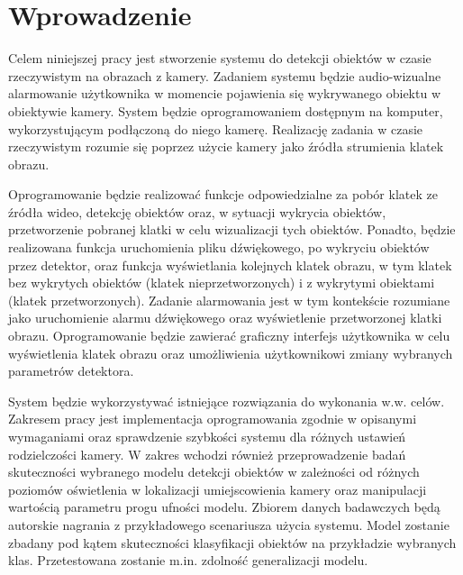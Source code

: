 \chapter{Wprowadzenie}
Celem niniejszej pracy jest stworzenie systemu do detekcji obiektów w czasie rzeczywistym na obrazach z kamery. Zadaniem systemu będzie audio-wizualne alarmowanie użytkownika w momencie pojawienia się wykrywanego obiektu w obiektywie kamery. System będzie oprogramowaniem dostępnym na komputer, wykorzystującym podłączoną do niego kamerę. Realizację zadania w czasie rzeczywistym rozumie się poprzez użycie kamery jako źródła strumienia klatek obrazu. 

Oprogramowanie będzie realizować funkcje odpowiedzialne za pobór klatek ze źródła wideo, detekcję obiektów oraz, w sytuacji wykrycia obiektów, przetworzenie pobranej klatki w celu wizualizacji tych obiektów. Ponadto, będzie realizowana funkcja uruchomienia pliku dźwiękowego, po wykryciu obiektów przez detektor, oraz funkcja wyświetlania kolejnych klatek obrazu, w tym klatek bez wykrytych obiektów (klatek nieprzetworzonych) i z wykrytymi obiektami (klatek przetworzonych). Zadanie alarmowania jest w tym kontekście rozumiane jako uruchomienie alarmu dźwiękowego oraz wyświetlenie przetworzonej klatki obrazu. Oprogramowanie będzie zawierać graficzny interfejs użytkownika w celu wyświetlenia klatek obrazu oraz umożliwienia użytkownikowi zmiany wybranych parametrów detektora.

System będzie wykorzystywać istniejące rozwiązania do wykonania w.w. celów. Zakresem pracy jest implementacja oprogramowania zgodnie w opisanymi wymaganiami oraz sprawdzenie szybkości systemu dla różnych ustawień rodzielczości kamery. 
W zakres wchodzi również przeprowadzenie badań skuteczności wybranego modelu detekcji obiektów w zależności od różnych poziomów oświetlenia w lokalizacji umiejscowienia kamery oraz manipulacji wartością parametru progu ufności modelu. Zbiorem danych badawczych będą autorskie nagrania z przykładowego scenariusza użycia systemu. Model zostanie zbadany pod kątem skuteczności klasyfikacji obiektów na przykładzie wybranych klas. Przetestowana zostanie m.in. zdolność generalizacji modelu.     